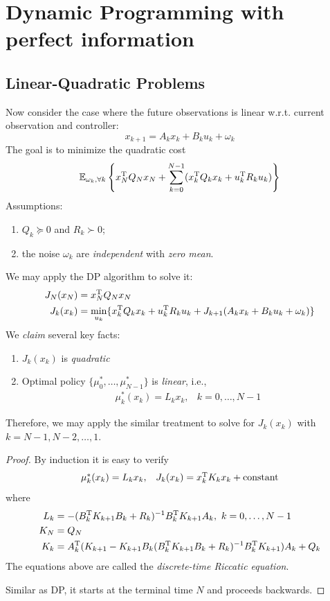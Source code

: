 \chapter{Dynamic Programming with perfect information}
\section{Linear-Quadratic Problems}
Now consider the case where the future observations is linear w.r.t. current observation and controller:
\[
x_{k+1} = A_kx_k+B_ku_k+\omega_k
\]
The goal is to minimize the quadratic cost
\[
\mathbb{E}_{\omega_k,\forall k}
\left\{
x_N^{\mathrm T} Q_Nx_N
+
\sum_{k=0}^{N-1}
(x_k^{\mathrm T} Q_kx_k+u_k^{\mathrm T} R_ku_k)
\right\}
\]
Assumptions:
\begin{enumerate}
\item
$Q_k\succeq0$ and $R_k\succ0$;
\item
the noise $\omega_k$ are \emph{independent} with \emph{zero mean}.
\end{enumerate}
We may apply the DP algorithm to solve it:
\begin{align*}
J_N(x_N)&=x_N^{\mathrm T} Q_Nx_N\\
J_k(x_k)&=\min_{u_k}\{x_k^{\mathrm T} Q_kx_k + u_k^{\mathrm T} R_ku_k + J_{k+1}(A_kx_k+B_ku_k+\omega_k)\}
\end{align*}
We \emph{claim} several key facts:
\begin{theorem}\label{The:3:1}
\begin{enumerate}
\item
$J_k(x_k)$ is \emph{quadratic}
\item
Optimal policy $\{\mu_0^*,\dots,\mu_{N-1}^*\}$ is \emph{linear}, i.e.,
\[
\begin{array}{ll}
\mu_k^*(x_k) = L_kx_k,&k=0,\dots,N-1
\end{array}
\]
\end{enumerate}
\end{theorem}

Therefore, we may apply the similar treatment to solve for $J_k(x_k)$ with $k=N-1,N-2,\dots,1$.
\begin{proof}
By induction it is easy to verify
\[
\begin{array}{ll}
\mu_k^*(x_k) = L_kx_k,
&
J_k(x_k) = x_k^{\mathrm T} K_kx_k+\text{constant}
\end{array}
\]
where 
\begin{align*}
L_k &= -(B_k\trans K_{k+1}B_k+R_k)^{-1}B_k\trans K_{k+1}A_k,\ k=0,\dots,N-1\\
K_N&=Q_N\\
K_k &=A_k\trans(K_{k+1} - K_{k+1}B_k(B_k\trans K_{k+1}B_k+R_k)^{-1}B_k\trans K_{k+1})A_k+Q_k
\end{align*}
The equations above are called the \emph{discrete-time Riccatic equation}.

Similar as DP, it starts at the terminal time $N$ and proceeds backwards.
\end{proof}
